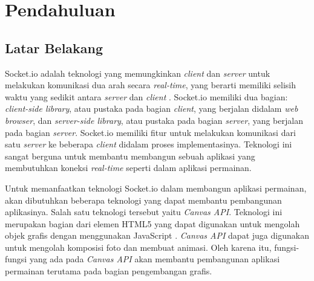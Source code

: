 \chapter{Pendahuluan}
\label{chap:intro}
   
\section{Latar Belakang}
\label{sec:label}



Socket.io adalah teknologi yang memungkinkan \textit{client} dan \textit{server} untuk melakukan komunikasi dua arah secara \textit{real-time}, yang berarti memiliki selisih waktu yang sedikit antara \textit{server} dan \textit{client} \cite{damien:11:socketiodocs}. Socket.io memiliki dua bagian: \textit{client-side library}, atau pustaka pada bagian \textit{client}, yang berjalan didalam \textit{web browser}, dan \textit{server-side library}, atau pustaka pada bagian \textit{server}, yang berjalan pada bagian \textit{server}. Socket.io memiliki fitur untuk melakukan komunikasi dari satu \textit{server} ke beberapa \textit{client} didalam proses implementasinya. Teknologi ini sangat berguna untuk membantu membangun sebuah aplikasi yang membutuhkan koneksi \textit{real-time} seperti dalam aplikasi permainan.

Untuk memanfaatkan teknologi Socket.io dalam membangun aplikasi permainan, akan dibutuhkan beberapa teknologi yang dapat membantu pembangunan aplikasinya. Salah satu teknologi tersebut yaitu \textit{Canvas API}. Teknologi ini merupakan bagian dari elemen HTML5 yang dapat digunakan untuk mengolah objek grafis dengan menggunakan JavaScript \cite{moz:04:canvasapi}. \textit{Canvas API} dapat juga digunakan untuk mengolah komposisi foto dan membuat animasi. Oleh karena itu, fungsi-fungsi yang ada pada \textit{Canvas API} akan membantu pembangunan aplikasi permainan terutama pada bagian pengembangan grafis.

